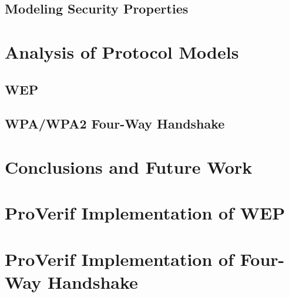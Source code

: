 \documentclass[11pt, twocolumn]{article} %
\begin{document}
\subsection{Modeling Security Properties}

\section{Analysis of Protocol Models}
\label{sec:analysis}
\subsection{WEP}
\subsection{WPA/WPA2 Four-Way Handshake}

\section{Conclusions and Future Work}
\label{sec:conclude}
\appendix
\section{ProVerif Implementation of WEP}
\section{ProVerif Implementation of Four-Way Handshake}


\end{document}
